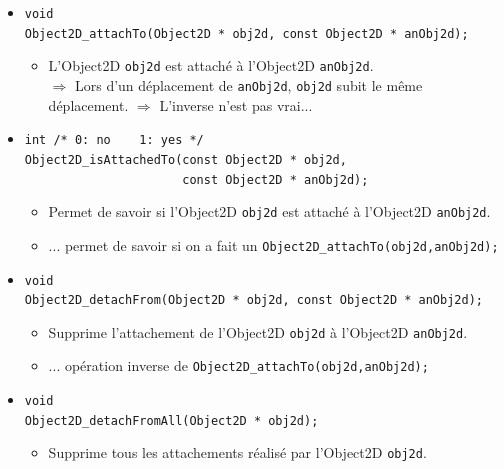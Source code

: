 \documentclass[12pt]{article}
\begin{document}
\vspace{0.3cm}
\begin{itemize}
\item \verb!void!\\
      \verb!Object2D_attachTo(Object2D * obj2d, const Object2D * anObj2d);!
      \begin{itemize}
      \item L'Object2D \verb!obj2d! est attach\'e \`a l'Object2D
            \verb!anObj2d!.\\
            $\Longrightarrow$ Lors d'un d\'eplacement de \verb!anObj2d!, 
            \verb!obj2d! subit le m\^eme d\'eplacement.
            $\Longrightarrow$ L'inverse n'est pas vrai...
      \end{itemize}
\vspace{0.1cm}
\item \verb!int /* 0: no    1: yes */! \\
      \verb!Object2D_isAttachedTo(const Object2D * obj2d,!\\
      \verb!                      const Object2D * anObj2d);!
      \begin{itemize}
      \item Permet de savoir si l'Object2D \verb!obj2d! est attach\'e
            \`a l'Object2D \verb!anObj2d!.
      \item ... permet de savoir si on a fait un
        \verb!Object2D_attachTo(obj2d,anObj2d);!
      \end{itemize}
\vspace{0.1cm}
\item \verb!void! \\
      \verb!Object2D_detachFrom(Object2D * obj2d, const Object2D * anObj2d);!
      \begin{itemize}
      \item Supprime l'attachement de l'Object2D \verb!obj2d! \`a
            l'Object2D \verb!anObj2d!.
      \item ... op\'eration inverse de \verb!Object2D_attachTo(obj2d,anObj2d);!
      \end{itemize}
\vspace{0.1cm}
\item \verb!void! \\
      \verb!Object2D_detachFromAll(Object2D * obj2d);!
      \begin{itemize}
      \item Supprime tous les attachements r\'ealis\'e par l'Object2D
       \verb!obj2d!.
      \end{itemize}
\end{itemize}
\end{document}
